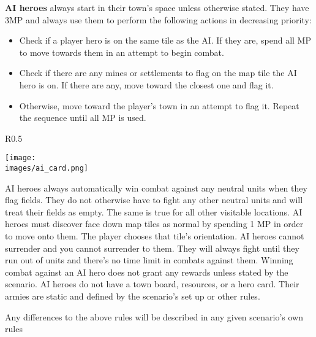 \documentclass[12pt]{article}
\def\assets{assets}
\def\images{\assets/images}
\begin{document}
\clearpage
\textbf{AI heroes} always start in their town's space unless otherwise stated. They have 3MP and always use them to perform the following actions in decreasing priority:
\begin{itemize}
    \item Check if a player hero is on the same tile as the AI. If they are, spend all MP to move towards them in an attempt to begin combat.
    \item Check if there are any mines or settlements to flag on the map tile the AI hero is on. If there are any, move toward the closest one and flag it.
    \item Otherwise, move toward the player's town in an attempt to flag it. Repeat the sequence until all MP is used.
\end{itemize}
\begin{wrapfigure}{R}{0.5\textwidth}
    \begin{center}
    \texttt{[image: \\images/ai\_card.png]}
    \end{center}
\end{wrapfigure}
AI heroes always automatically win combat against any neutral units when they flag fields. They do not otherwise have to fight any other neutral units and will treat their fields as empty. The same is true for all other visitable locations. AI heroes must discover face down map tiles as normal by spending 1 MP in order to move onto them. The player chooses that tile’s orientation. AI heroes cannot surrender and you cannot surrender to them. They will always fight until they run out of units and there’s no time limit in combats against them. Winning combat against an AI hero does not grant any rewards unless stated by the scenario. AI heroes do not have a town board, resources, or a hero card. Their armies are static and defined by the scenario’s set up or other rules.\par

Any differences to the above rules will be described in any given scenario’s own rules
\end{document}
